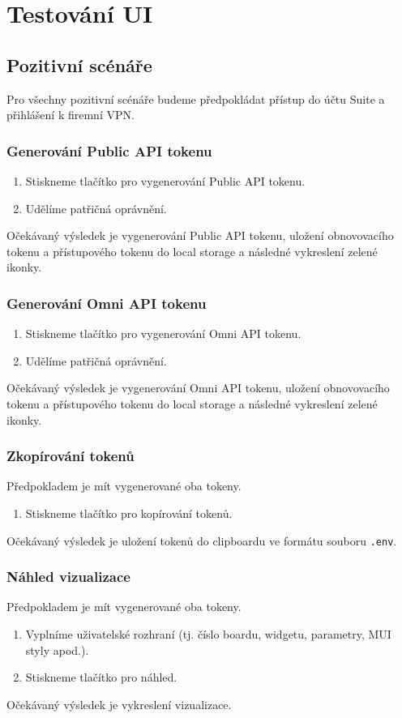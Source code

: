 \documentclass[czech, bc, kiv, he, iso690numb]{fasthesis}
\begin{document}
\section{Testování UI}
\subsection{Pozitivní scénáře}
Pro všechny pozitivní scénáře budeme předpokládat přístup do účtu Suite a přihlášení k firemní VPN.
\subsubsection{Generování Public API tokenu}
\begin{enumerate}
	\item Stiskneme tlačítko pro vygenerování Public API tokenu.
	\item Udělíme patřičná oprávnění.
\end{enumerate}
Očekávaný výsledek je vygenerování Public API tokenu, uložení obnovovacího tokenu a přístupového tokenu do local storage a následné vykreslení zelené ikonky.

\subsubsection{Generování Omni API tokenu}
\begin{enumerate}
	\item Stiskneme tlačítko pro vygenerování Omni API tokenu.
	\item Udělíme patřičná oprávnění.
\end{enumerate}
Očekávaný výsledek je vygenerování Omni API tokenu, uložení obnovovacího tokenu a přístupového tokenu do local storage a následné vykreslení zelené ikonky.

\subsubsection{Zkopírování tokenů}
Předpokladem je mít vygenerované oba tokeny.
\begin{enumerate}
	\item Stiskneme tlačítko pro kopírování tokenů.
\end{enumerate}
Očekávaný výsledek je uložení tokenů do clipboardu ve formátu souboru \texttt{.env}.

\subsubsection{Náhled vizualizace}
Předpokladem je mít vygenerované oba tokeny.
\begin{enumerate}
	\item Vyplníme uživatelské rozhraní (tj. číslo boardu, widgetu, parametry, MUI styly apod.).
	\item Stiskneme tlačítko pro náhled.
\end{enumerate}
Očekávaný výsledek je vykreslení vizualizace.
\end{document}
